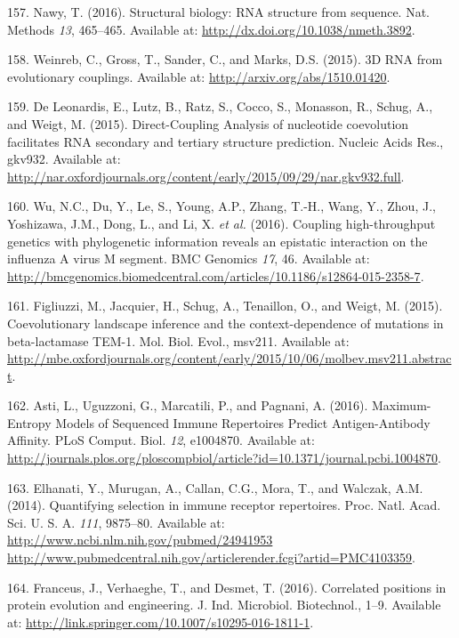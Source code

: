 \documentclass[11pt,a4paper,twoside]{book}
\theoremstyle{definition}
\theoremstyle{definition}
\theoremstyle{remark}
\begin{document}
\hypertarget{ref-Nawy2016}{}
157. Nawy, T. (2016). Structural biology: RNA structure from sequence.
Nat. Methods \emph{13}, 465--465. Available at:
\url{http://dx.doi.org/10.1038/nmeth.3892}.

\hypertarget{ref-Weinreb2015}{}
158. Weinreb, C., Gross, T., Sander, C., and Marks, D.S. (2015). 3D RNA
from evolutionary couplings. Available at:
\url{http://arxiv.org/abs/1510.01420}.

\hypertarget{ref-DeLeonardis2015a}{}
159. De Leonardis, E., Lutz, B., Ratz, S., Cocco, S., Monasson, R.,
Schug, A., and Weigt, M. (2015). Direct-Coupling Analysis of nucleotide
coevolution facilitates RNA secondary and tertiary structure prediction.
Nucleic Acids Res., gkv932. Available at:
\url{http://nar.oxfordjournals.org/content/early/2015/09/29/nar.gkv932.full}.

\hypertarget{ref-Wu2016}{}
160. Wu, N.C., Du, Y., Le, S., Young, A.P., Zhang, T.-H., Wang, Y.,
Zhou, J., Yoshizawa, J.M., Dong, L., and Li, X. \emph{et al.} (2016).
Coupling high-throughput genetics with phylogenetic information reveals
an epistatic interaction on the influenza A virus M segment. BMC
Genomics \emph{17}, 46. Available at:
\url{http://bmcgenomics.biomedcentral.com/articles/10.1186/s12864-015-2358-7}.

\hypertarget{ref-Figliuzzi2015}{}
161. Figliuzzi, M., Jacquier, H., Schug, A., Tenaillon, O., and Weigt,
M. (2015). Coevolutionary landscape inference and the context-dependence
of mutations in beta-lactamase TEM-1. Mol. Biol. Evol., msv211.
Available at:
\url{http://mbe.oxfordjournals.org/content/early/2015/10/06/molbev.msv211.abstract}.

\hypertarget{ref-Asti2016}{}
162. Asti, L., Uguzzoni, G., Marcatili, P., and Pagnani, A. (2016).
Maximum-Entropy Models of Sequenced Immune Repertoires Predict
Antigen-Antibody Affinity. PLoS Comput. Biol. \emph{12}, e1004870.
Available at:
\url{http://journals.plos.org/ploscompbiol/article?id=10.1371/journal.pcbi.1004870}.

\hypertarget{ref-Elhanati2014}{}
163. Elhanati, Y., Murugan, A., Callan, C.G., Mora, T., and Walczak,
A.M. (2014). Quantifying selection in immune receptor repertoires. Proc.
Natl. Acad. Sci. U. S. A. \emph{111}, 9875--80. Available at:
\href{http://www.ncbi.nlm.nih.gov/pubmed/24941953\%20http://www.pubmedcentral.nih.gov/articlerender.fcgi?artid=PMC4103359}{http://www.ncbi.nlm.nih.gov/pubmed/24941953 http://www.pubmedcentral.nih.gov/articlerender.fcgi?artid=PMC4103359}.

\hypertarget{ref-Franceus2016}{}
164. Franceus, J., Verhaeghe, T., and Desmet, T. (2016). Correlated
positions in protein evolution and engineering. J. Ind. Microbiol.
Biotechnol., 1--9. Available at:
\url{http://link.springer.com/10.1007/s10295-016-1811-1}.
\end{document}
